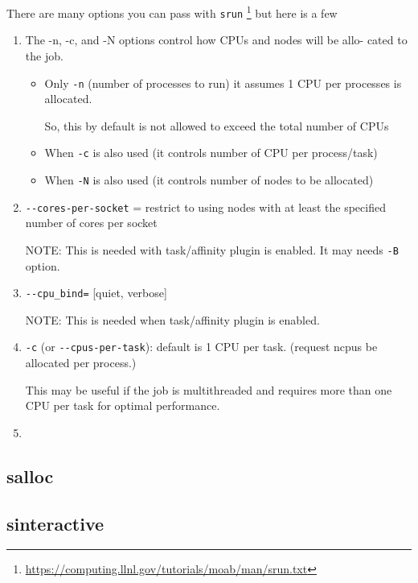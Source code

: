 There are many options you can pass with \verb!srun! 
\footnote{\url{https://computing.llnl.gov/tutorials/moab/man/srun.txt}}
but here is a few
\begin{enumerate}
  
  \item The -n, -c, and -N options control how CPUs  and nodes  will  be  allo-
       cated  to  the job.
  \begin{itemize}
    \item Only \verb!-n! (number of processes to run)
    it assumes 1 CPU per processes is allocated.
    
    So, this by default is not allowed to exceed the total number of CPUs 
    
    \item When \verb!-c! is also used (it controls number of CPU per
    process/task)
    
    
    \item When \verb!-N! is also used (it controls number of nodes to be
    allocated)
  \end{itemize}     
       
  \item \verb!--cores-per-socket! = 
  restrict to using nodes with at least the specified number of cores per socket
  
  NOTE: This is needed with task/affinity plugin is enabled.
  It may needs \verb!-B! option.
  
  \item \verb!--cpu_bind=! [quiet, verbose]
  
  NOTE: This is needed when task/affinity plugin is enabled.
  
  \item \verb!-c! (or \verb!--cpus-per-task!): default is 1 CPU per task.
  (request ncpus be allocated per process.)
  
  This may be useful if the job is multithreaded and requires more than one  CPU
   per task  for  optimal  performance.
              
  \item 
  
\end{enumerate}


\subsection{salloc}
\label{sec:SLURM-salloc}


\subsection{sinteractive}
\label{sec:sinteractive}

